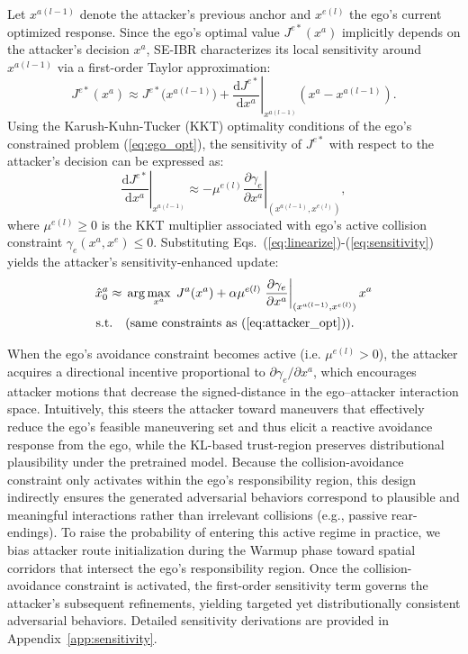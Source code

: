 \documentclass[10pt,twocolumn,letterpaper]{article}
\theoremstyle{plain}
\theoremstyle{remark}
\begin{document}
Let \(x^{a(l-1)}\) denote the attacker’s previous anchor and \(x^{e(l)}\) the ego’s current optimized response. 
Since the ego’s optimal value \(J^{e*}(x^a)\) implicitly depends on the attacker’s decision \(x^a\),  SE-IBR characterizes its local sensitivity around \(x^{a(l-1)}\) via a first-order Taylor approximation:
\begin{equation}
J^{e*}(x^a) \approx J^{e*}\!\big(x^{a(l-1)}\big)
+ \left.\frac{\mathrm{d} J^{e*}}{\mathrm{d} x^a}\right|_{x^{a(l-1)}}\!(x^a - x^{a(l-1)}).
\label{eq:linearize}
\end{equation}
Using the Karush-Kuhn-Tucker (KKT) optimality conditions of the ego’s constrained problem (\ref{eq:ego_opt}),  the sensitivity of \(J^{e*}\) with respect to the attacker’s decision can be expressed as:
\begin{equation}
\left.\frac{\mathrm{d} J^{e*}}{\mathrm{d} x^a}\right|_{x^{a(l-1)}} 
\approx -\mu^{e(l)} 
\left.\frac{\partial \gamma_e}{\partial x^a}\right|_{(x^{a(l-1)},x^{e(l)})},
\label{eq:sensitivity}
\end{equation}
where \(\mu^{e(l)}\!\ge\!0\) is the KKT multiplier associated with ego’s active collision constraint \(\gamma_e(x^a,x^e)\le0\).  
Substituting Eqs.~(\ref{eq:linearize})-(\ref{eq:sensitivity}) yields the attacker’s sensitivity-enhanced update:
\begin{equation}
\begin{aligned}
\hat{x}_0^a \approx\; &\arg\max_{x^a}\; 
J^a(x^a) 
+ \alpha \mu^{e(l)} 
\left.\frac{\partial \gamma_e}{\partial x^a}\right|_{(x^{a(l-1)},x^{e(l)})}
x^a
 \\
\text{s.t.}\quad 
&\text{(same constraints as (\ref{eq:attacker_opt})).}
\end{aligned}
\label{eq:attacker_seibr}
\end{equation}


When the ego’s avoidance constraint becomes active (i.e. \(\mu^{e(l)}>0\)), the attacker acquires a directional incentive proportional to $\partial \gamma_e/{\partial x^a}$, which encourages attacker motions that decrease the signed-distance in the ego--attacker interaction space. 
Intuitively, this steers the attacker toward maneuvers that effectively reduce the ego’s feasible maneuvering set and thus elicit a reactive avoidance response from the ego, while the KL-based trust-region preserves distributional plausibility under the pretrained model. Because the collision-avoidance constraint only activates within the ego’s responsibility region, this design indirectly ensures the generated adversarial behaviors correspond to plausible and meaningful interactions rather than irrelevant collisions (e.g., passive rear-endings). To raise the probability of entering this active regime in practice, we bias attacker route initialization during the Warmup phase toward spatial corridors that intersect the ego’s responsibility region. Once the collision-avoidance constraint is activated, the first-order sensitivity term governs the attacker’s subsequent refinements, yielding targeted yet distributionally consistent adversarial behaviors. Detailed sensitivity derivations are provided in Appendix~\ref{app:sensitivity}.
\end{document}
